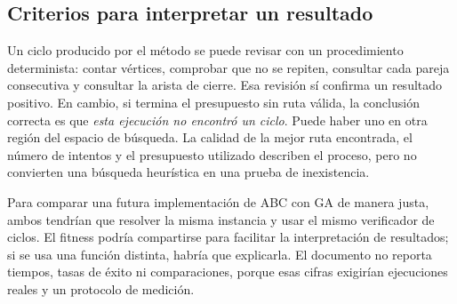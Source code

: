 \documentclass[11pt,letterpaper]{article}
\begin{document}
\subsection{Criterios para interpretar un resultado}
Un ciclo producido por el método se puede revisar con un procedimiento determinista: contar vértices, comprobar que no se repiten, consultar cada pareja consecutiva y consultar la arista de cierre. Esa revisión sí confirma un resultado positivo. En cambio, si termina el presupuesto sin ruta válida, la conclusión correcta es que \emph{esta ejecución no encontró un ciclo}. Puede haber uno en otra región del espacio de búsqueda. La calidad de la mejor ruta encontrada, el número de intentos y el presupuesto utilizado describen el proceso, pero no convierten una búsqueda heurística en una prueba de inexistencia.

Para comparar una futura implementación de ABC con GA de manera justa, ambos tendrían que resolver la misma instancia y usar el mismo verificador de ciclos. El fitness podría compartirse para facilitar la interpretación de resultados; si se usa una función distinta, habría que explicarla. El documento no reporta tiempos, tasas de éxito ni comparaciones, porque esas cifras exigirían ejecuciones reales y un protocolo de medición.
\end{document}
